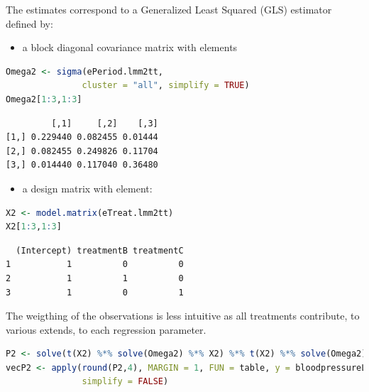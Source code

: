 \documentclass[12pt]{article}
\begin{document}
\noindent The estimates correspond to a Generalized Least Squared (GLS)
estimator defined by:

\smallskip


\begin{minipage}[t]{0.55\linewidth}
\begin{itemize}
\item a block diagonal covariance matrix with elements
\end{itemize}
\begin{lstlisting}[language=r,numbers=none]
Omega2 <- sigma(ePeriod.lmm2tt,
               cluster = "all", simplify = TRUE)
Omega2[1:3,1:3]
\end{lstlisting}

\label{}
\begin{verbatim}
         [,1]     [,2]    [,3]
[1,] 0.229440 0.082455 0.01444
[2,] 0.082455 0.249826 0.11704
[3,] 0.014440 0.117040 0.36480
\end{verbatim}


\end{minipage}
\begin{minipage}[t]{0.02\linewidth}
\hphantom{x}
\end{minipage}
\begin{minipage}[t]{0.4\linewidth}
\begin{itemize}
\item a design matrix with element:
\end{itemize}
\begin{lstlisting}[language=r,numbers=none]
X2 <- model.matrix(eTreat.lmm2tt)
X2[1:3,1:3]
\end{lstlisting}

\label{}
\begin{verbatim}
  (Intercept) treatmentB treatmentC
1           1          0          0
2           1          1          0
3           1          0          1
\end{verbatim}

\end{minipage}

\noindent The weigthing of the observations is less intuitive as all
treatments contribute, to various extends, to each regression parameter.

\begin{lstlisting}[language=r,numbers=none]
P2 <- solve(t(X2) %*% solve(Omega2) %*% X2) %*% t(X2) %*% solve(Omega2)
vecP2 <- apply(round(P2,4), MARGIN = 1, FUN = table, y = bloodpressureL$treatment,
               simplify = FALSE)
\end{lstlisting}
\end{document}
